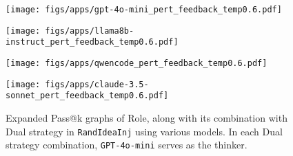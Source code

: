  \begin{figure*}[ht]
    \centering
    
    \begin{minipage}{0.24\textwidth}
        \texttt{[image: figs/apps/gpt-4o-mini\_pert\_feedback\_temp0.6.pdf]}
        \label{fig:role_feedback_4omini}
    \end{minipage}
    \hfill
    \begin{minipage}{0.24\textwidth}
        \texttt{[image: figs/apps/llama8b-instruct\_pert\_feedback\_temp0.6.pdf]}
        \label{fig:role_feedback_llama}
    \end{minipage}
    \hfill
    \begin{minipage}{0.24\textwidth}
        \texttt{[image: figs/apps/qwencode\_pert\_feedback\_temp0.6.pdf]}
        \label{fig:role_feedback_qwen}
    \end{minipage}
    \hfill
    \begin{minipage}{0.24\textwidth}
        \texttt{[image: figs/apps/claude-3.5-sonnet\_pert\_feedback\_temp0.6.pdf]}
       \label{fig:role_feedback_claude}
    \end{minipage}
    \vspace{-0.7cm}
    \caption{Expanded Pass@k graphs of Role, along with its combination with Dual strategy in \texttt{RandIdeaInj} using various models. In each Dual strategy combination, \texttt{GPT-4o-mini} serves as the thinker.}
    \label{fig:pert_feedback_models}\vspace{-0.4cm}
\end{figure*}